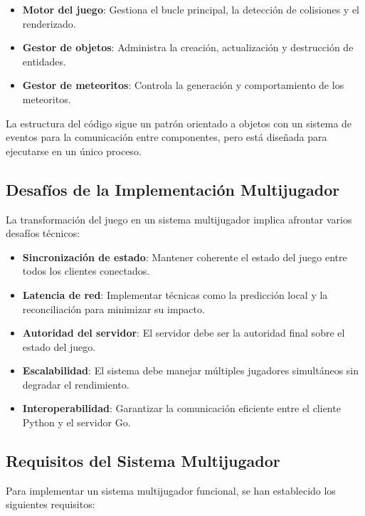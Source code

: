 \documentclass[11pt,letterpaper]{article}
\begin{document}
\begin{itemize}
    \item \textbf{Motor del juego}: Gestiona el bucle principal, la detección de colisiones y el renderizado.
    \item \textbf{Gestor de objetos}: Administra la creación, actualización y destrucción de entidades.
    \item \textbf{Gestor de meteoritos}: Controla la generación y comportamiento de los meteoritos.
\end{itemize}

La estructura del código sigue un patrón orientado a objetos con un sistema de eventos para la comunicación entre componentes, pero está diseñada para ejecutarse en un único proceso.

\subsection{Desafíos de la Implementación Multijugador}

La transformación del juego en un sistema multijugador implica afrontar varios desafíos técnicos:

\begin{itemize}
    \item \textbf{Sincronización de estado}: Mantener coherente el estado del juego entre todos los clientes conectados.
    
    \item \textbf{Latencia de red}: Implementar técnicas como la predicción local y la reconciliación para minimizar su impacto.
    
    \item \textbf{Autoridad del servidor}: El servidor debe ser la autoridad final sobre el estado del juego.
    
    \item \textbf{Escalabilidad}: El sistema debe manejar múltiples jugadores simultáneos sin degradar el rendimiento.
    
    \item \textbf{Interoperabilidad}: Garantizar la comunicación eficiente entre el cliente Python y el servidor Go.
\end{itemize}

\subsection{Requisitos del Sistema Multijugador}

Para implementar un sistema multijugador funcional, se han establecido los siguientes requisitos:
\end{document}
